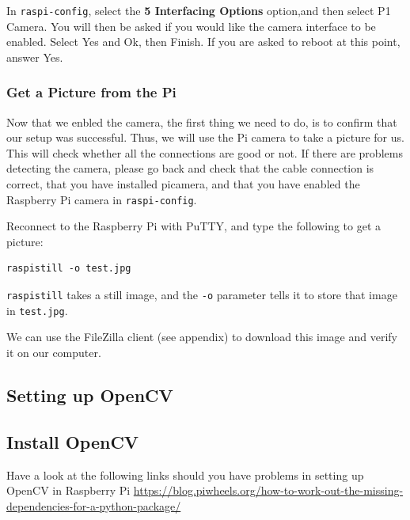 In \lstinline{raspi-config}, select the \textbf{5 Interfacing Options} option,and then select P1 Camera. 
You will then be asked if you would like the camera interface to be enabled. Select Yes and Ok, then Finish. 
If you are asked to reboot at this point, answer Yes. 


\subsubsection{Get a Picture from the Pi}
\label{get_a_picture}

Now that we enbled the camera, the first thing we need to do, is to confirm that our setup was successful.
Thus, we will use the Pi camera to take a picture for us. This will check whether all the connections are good or not.
If there are problems detecting the camera, please go back and check that the cable
connection is correct, that you have installed picamera, and that you have enabled the
Raspberry Pi camera in \lstinline{raspi-config}.

Reconnect to the Raspberry Pi with PuTTY, and type the following to get a picture:

\begin{lstlisting}
raspistill -o test.jpg
\end{lstlisting}

\lstinline{raspistill} takes a still image, and the \lstinline{-o} parameter tells it to store that image in
\lstinline{test.jpg}. 

We can use the FileZilla client (see appendix) to download this image and verify it on our computer. 


\subsection{Setting up OpenCV}
\label{setup_opencv}

\subsection{Install OpenCV}


\begin{framed}
\begin{remark}

Have a look at the following links should you have problems in setting up OpenCV in Raspberry Pi
\url{https://blog.piwheels.org/how-to-work-out-the-missing-dependencies-for-a-python-package/}
\end{remark}
\end{framed}

